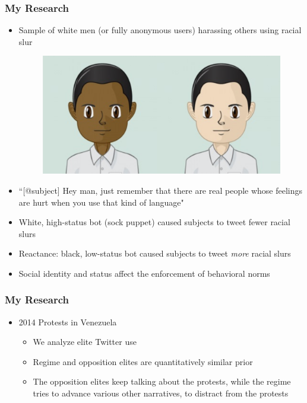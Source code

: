 \documentclass{beamer}
\begin{document}
	



\begin{frame}
	\frametitle{My Research}
	\begin{itemize}
		
		\item Sample of white men (or fully anonymous users) harassing others using racial slur
		\pause 
		\begin{figure}
			
			
			\includegraphics[scale=.10]{figures/white_black_bot_comparison.png}
		\end{figure}
		\pause
		\item ``[@subject] Hey man, just remember that there are real people whose feelings are hurt when you use that kind of language"
		\pause
		\item White, high-status bot (sock puppet) caused subjects to tweet fewer racial slurs
		\pause
		\item Reactance: black, low-status bot caused subjects to tweet \textit{more} racial slurs
		\pause
		\item Social identity and status affect the enforcement of behavioral norms
		
		
	\end{itemize}
\end{frame}	
	



\begin{frame}
	\frametitle{My Research}
	\begin{itemize}
		
		
		

			\item 2014 Protests in Venezuela 


			\begin{itemize}
				\item We analyze elite Twitter use \pause
				\item Regime and opposition elites are quantitatively similar prior  \pause

				\item The opposition elites keep talking about the protests, while the regime tries to advance various other narratives, to distract from the protests \pause

				
			\end{itemize}


		
	\end{itemize}
\end{frame}	
\end{document}

